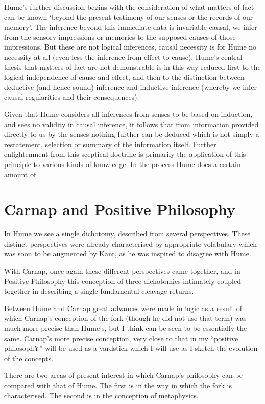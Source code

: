 Hume's further discussion begins with the consideration of what
matters of fact can be known `beyond the present testimony of 
our senses or the records of our memory'.
The inference beyond this immediate data is invariable causal, we
infer from the sensory impressions or memories to the supposed causes
of those impressions.
But these are not logical inferences, causal necessity is for Hume no
necessity at all (even less the inference from effect to cause).
Hume's central thesis that matters of fact are not demonstrable is
in this way reduced first to the logical independence of cause and
effect, and then to the distinction between deductive (and hence sound)
inference and inductive inference (whereby we infer causal
regularities and their consequences).

Given that Hume considers all inferences from senses to be based on
induction, and sees no validity in causal inference, it follows that
from information provided directly to us by the senses nothing further
can be deduced which is not simply a restatement, selection or summary
of the information itself.
Further enlightenment from this sceptical doctrine is primarily the
application of this principle to various kinds of knowledge.
In the process Hume does a certain amount of 

\section{Carnap and Positive Philosophy}

In Hume we see a single dichotomy, described from several
perspectives.
These distinct perspectives were already characterised by appropriate
volabulary which was soon to be augmented by Kant, as he was inspired
to disagree with Hume.

With Carnap, once again these different perspectives came together,
and in Positive Philosophy this conception of three dichotomies
intimately coupled together in describing a single fundamental
cleavage returns.

Between Hume and Carnap great advances were made in logic as a result
of which Carnap's conception of the fork (though he did not use that
term) was much more precise than Hume's, but I think can be seen to be
essentially the same.
Carnap's more precise conception, very close to that in my ``positive
philosophY'' will be used as a yardstick which I will use as I sketch
the evolution of the concepts.

There are two areas of present interest in which Carnap's philosophy
can be compared with that of Hume.
The first is in the way in which the fork is characterised.
The second is in the conception of metaphysics.

